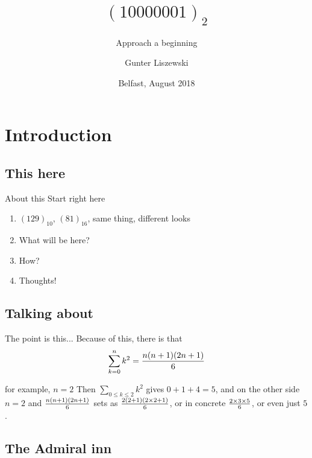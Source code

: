 \documentclass[pdf]{beamer}
\title{$(10000001)_2$}
\subtitle{Approach a beginning}
\author[Gunter Liszewski\\ \copyright 2018]{Gunter Liszewski}
\date{Belfast, August 2018}
\begin{document}
\begin{frame}
  \titlepage
\end{frame}


\section{Introduction}
\subsection{This here}

\begin{frame}{About this}
  Start right here
  \begin{enumerate}[A]
    \pause
    \item{} $(129)_{10}$, $(81)_{16}$, same thing, different looks
    \pause
    \item{} What will be here?
    \pause
    \item{} How?
    \pause
    \item{} Thoughts!
  \end{enumerate}
\end{frame}
\subsection{Talking about}

\begin{frame}{The point is this...}
  Because of this, there is that
$$\sum_{k=0}^{n}{k^2}={n(n+1)(2n+1)\over 6}$$
\end{frame}


\begin{frame}{for example, $n=2$}
  Then $\sum_{0\le k\le2}k^2$ gives $0+1+4=5$, and on the other side $n=2$ and ${n(n+1)(2n+1)\over 6}$
sets as ${2(2+1)(2\times2+1)\over 6}$, or in concrete $2\times3\times5\over6$, or even just $5$.
\end{frame}

\subsection{The Admiral inn}
\end{document}
